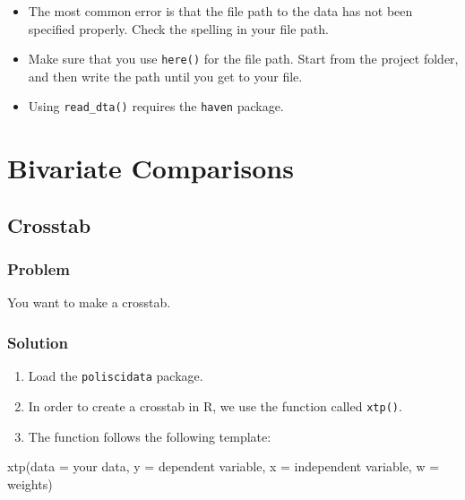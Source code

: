\documentclass[
]{book}
\newenvironment{Shaded}{\begin{snugshade}}{\end{snugshade}}
\newcommand{\AttributeTok}[1]{\textcolor[rgb]{0.77,0.63,0.00}{#1}}
\newcommand{\FunctionTok}[1]{\textcolor[rgb]{0.00,0.00,0.00}{#1}}
\newcommand{\NormalTok}[1]{#1}
\providecommand{\tightlist}{%
  \setlength{\itemsep}{0pt}\setlength{\parskip}{0pt}}
\begin{document}
\begin{itemize}
\tightlist
\item
  The most common error is that the file path to the data has not been specified properly. Check the spelling in your file path.
\item
  Make sure that you use \texttt{here()} for the file path. Start from the project folder, and then write the path until you get to your file.
\item
  Using \texttt{read\_dta()} requires the \texttt{haven} package.
\end{itemize}

\hypertarget{bivariate-comparisons}{%
\chapter{Bivariate Comparisons}\label{bivariate-comparisons}}

\hypertarget{crosstab}{%
\section{Crosstab}\label{crosstab}}

\hypertarget{problem-11}{%
\subsection{Problem}\label{problem-11}}

You want to make a crosstab.

\hypertarget{solution-11}{%
\subsection{Solution}\label{solution-11}}

\begin{enumerate}
\def\labelenumi{\arabic{enumi}.}
\tightlist
\item
  Load the \texttt{poliscidata} package.
\item
  In order to create a crosstab in R, we use the function called \texttt{xtp()}.\\
\item
  The function follows the following template:
\end{enumerate}

\begin{Shaded}
\begin{Highlighting}[]
\FunctionTok{xtp}\NormalTok{(}\AttributeTok{data =}\NormalTok{ your data, }\AttributeTok{y =}\NormalTok{ dependent variable, }\AttributeTok{x =}\NormalTok{ independent variable, }\AttributeTok{w =}\NormalTok{ weights)}
\end{Highlighting}
\end{Shaded}
\end{document}
